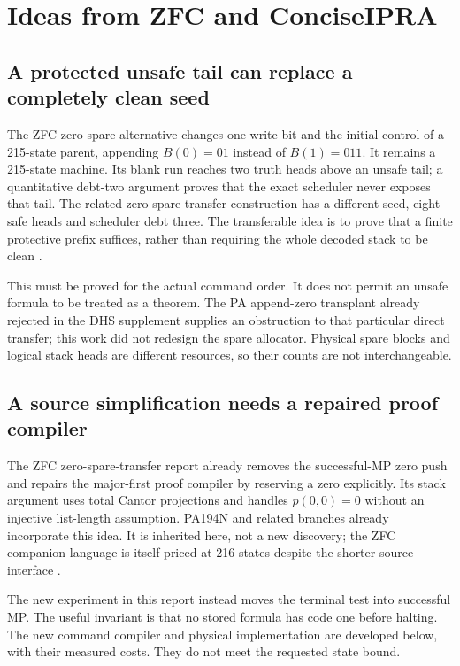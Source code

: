 \section{Ideas from ZFC and ConciseIPRA}
\label{sec:related}

\subsection{A protected unsafe tail can replace a completely clean seed}

The ZFC zero-spare alternative changes one write bit and the initial
control of a 215-state parent, appending $B(0)=01$ instead of $B(1)=011$.
It remains a 215-state machine. Its blank run reaches two truth heads
above an unsafe tail; a quantitative debt-two argument proves that the
exact scheduler never exposes that tail. The related zero-spare-transfer
construction has a different seed, eight safe heads and scheduler debt
three. The transferable idea is to prove that a finite protective prefix
suffices, rather than requiring the whole decoded stack to be clean
\cite{z-zero,z-transfer}.

This must be proved for the actual command order. It does not permit an
unsafe formula to be treated as a theorem. The PA append-zero transplant
already rejected in the DHS supplement supplies an obstruction to that
particular direct transfer; this work did not redesign the spare
allocator. Physical spare blocks and logical stack heads are different
resources, so their counts are not interchangeable.

\subsection{A source simplification needs a repaired proof compiler}

The ZFC zero-spare-transfer report already removes the successful-MP
zero push and repairs the major-first proof compiler by reserving a zero
explicitly. Its stack argument uses total Cantor projections and handles
$p(0,0)=0$ without an injective list-length assumption. PA194N and related
branches already incorporate this idea. It is inherited here, not a new
discovery; the ZFC companion language is itself priced at 216 states
despite the shorter source interface \cite{z-transfer}.

The new experiment in this report instead moves the terminal test into
successful MP. The useful invariant is that no stored formula has code
one before halting. The new command compiler and physical implementation
are developed below, with their measured costs. They do not meet the
requested state bound.

